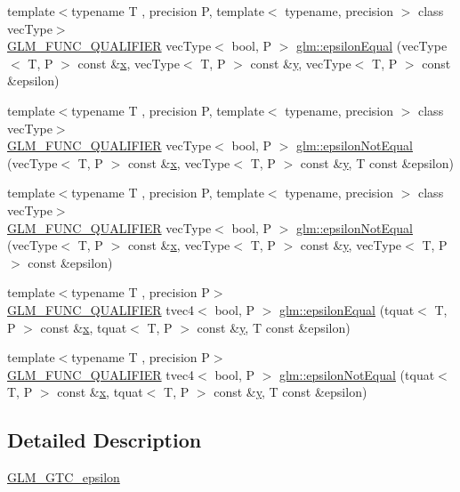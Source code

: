 \begin{DoxyCompactItemize}
\item 
{\footnotesize template$<$typename T , precision P, template$<$ typename, precision $>$ class vec\+Type$>$ }\\\mbox{\hyperlink{setup_8hpp_a33fdea6f91c5f834105f7415e2a64407}{G\+L\+M\+\_\+\+F\+U\+N\+C\+\_\+\+Q\+U\+A\+L\+I\+F\+I\+ER}} vec\+Type$<$ bool, P $>$ \mbox{\hyperlink{namespaceglm_abc7f87cb473f9c9d7d6109e96c139807}{glm\+::epsilon\+Equal}} (vec\+Type$<$ T, P $>$ const \&\mbox{\hyperlink{glad_8h_a92d0386e5c19fb81ea88c9f99644ab1d}{x}}, vec\+Type$<$ T, P $>$ const \&\mbox{\hyperlink{glad_8h_a66ddd433d2cacfe27f5906b7e86faeed}{y}}, vec\+Type$<$ T, P $>$ const \&epsilon)
\item 
{\footnotesize template$<$typename T , precision P, template$<$ typename, precision $>$ class vec\+Type$>$ }\\\mbox{\hyperlink{setup_8hpp_a33fdea6f91c5f834105f7415e2a64407}{G\+L\+M\+\_\+\+F\+U\+N\+C\+\_\+\+Q\+U\+A\+L\+I\+F\+I\+ER}} vec\+Type$<$ bool, P $>$ \mbox{\hyperlink{namespaceglm_a76da74051c42eebf3256cd31464fa043}{glm\+::epsilon\+Not\+Equal}} (vec\+Type$<$ T, P $>$ const \&\mbox{\hyperlink{glad_8h_a92d0386e5c19fb81ea88c9f99644ab1d}{x}}, vec\+Type$<$ T, P $>$ const \&\mbox{\hyperlink{glad_8h_a66ddd433d2cacfe27f5906b7e86faeed}{y}}, T const \&epsilon)
\item 
{\footnotesize template$<$typename T , precision P, template$<$ typename, precision $>$ class vec\+Type$>$ }\\\mbox{\hyperlink{setup_8hpp_a33fdea6f91c5f834105f7415e2a64407}{G\+L\+M\+\_\+\+F\+U\+N\+C\+\_\+\+Q\+U\+A\+L\+I\+F\+I\+ER}} vec\+Type$<$ bool, P $>$ \mbox{\hyperlink{namespaceglm_a34387d61360bf88bcca96b797f53e49d}{glm\+::epsilon\+Not\+Equal}} (vec\+Type$<$ T, P $>$ const \&\mbox{\hyperlink{glad_8h_a92d0386e5c19fb81ea88c9f99644ab1d}{x}}, vec\+Type$<$ T, P $>$ const \&\mbox{\hyperlink{glad_8h_a66ddd433d2cacfe27f5906b7e86faeed}{y}}, vec\+Type$<$ T, P $>$ const \&epsilon)
\item 
{\footnotesize template$<$typename T , precision P$>$ }\\\mbox{\hyperlink{setup_8hpp_a33fdea6f91c5f834105f7415e2a64407}{G\+L\+M\+\_\+\+F\+U\+N\+C\+\_\+\+Q\+U\+A\+L\+I\+F\+I\+ER}} tvec4$<$ bool, P $>$ \mbox{\hyperlink{namespaceglm_a9573ceefb3bf8f199bd920f2a7ffa4cb}{glm\+::epsilon\+Equal}} (tquat$<$ T, P $>$ const \&\mbox{\hyperlink{glad_8h_a92d0386e5c19fb81ea88c9f99644ab1d}{x}}, tquat$<$ T, P $>$ const \&\mbox{\hyperlink{glad_8h_a66ddd433d2cacfe27f5906b7e86faeed}{y}}, T const \&epsilon)
\item 
{\footnotesize template$<$typename T , precision P$>$ }\\\mbox{\hyperlink{setup_8hpp_a33fdea6f91c5f834105f7415e2a64407}{G\+L\+M\+\_\+\+F\+U\+N\+C\+\_\+\+Q\+U\+A\+L\+I\+F\+I\+ER}} tvec4$<$ bool, P $>$ \mbox{\hyperlink{namespaceglm_a1fcc8ab0db03be6e6c6c375b170c1f79}{glm\+::epsilon\+Not\+Equal}} (tquat$<$ T, P $>$ const \&\mbox{\hyperlink{glad_8h_a92d0386e5c19fb81ea88c9f99644ab1d}{x}}, tquat$<$ T, P $>$ const \&\mbox{\hyperlink{glad_8h_a66ddd433d2cacfe27f5906b7e86faeed}{y}}, T const \&epsilon)
\end{DoxyCompactItemize}


\subsection{Detailed Description}
\mbox{\hyperlink{group__gtc__epsilon}{G\+L\+M\+\_\+\+G\+T\+C\+\_\+epsilon}} 
